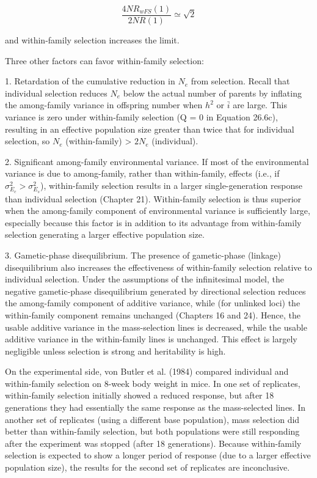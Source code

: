 \documentclass{article}
\begin{document}
{\begin{equation}
\frac{4NR_{wFS}(1)}{2NR(1)}\simeq\sqrt{2}
\end{equation}

and within-family selection increases the limit.

Three other factors can favor within-family selection:

1. Retardation of the cumulative reduction in  $ N_e $ from selection. Recall that individual selection reduces  $ N_e $ below the actual number of parents by inflating the among-family variance in offspring number when  $ h^2 $ or  $ \bar{i} $ are large. This variance is zero under within-family selection (Q = 0 in Equation 26.6c), resulting in an effective population size greater than twice that for individual selection, so  $ N_e $ (within-family) >  $ 2N_e $ (individual).

2. Significant among-family environmental variance. If most of the environmental variance is due to among-family, rather than within-family, effects (i.e., if  $ \sigma_{E_c}^2 > \sigma_{E_s}^2 $), within-family selection results in a larger single-generation response than individual selection (Chapter 21). Within-family selection is thus superior when the among-family component of environmental variance is sufficiently large, especially because this factor is in addition to its advantage from within-family selection generating a larger effective population size.

3. Gametic-phase disequilibrium. The presence of gametic-phase (linkage) disequilibrium also increases the effectiveness of within-family selection relative to individual selection. Under the assumptions of the infinitesimal model, the negative gametic-phase disequilibrium generated by directional selection reduces the among-family component of additive variance, while (for unlinked loci) the within-family component remains unchanged (Chapters 16 and 24). Hence, the usable additive variance in the mass-selection lines is decreased, while the usable additive variance in the within-family lines is unchanged. This effect is largely negligible unless selection is strong and heritability is high.

On the experimental side, von Butler et al. (1984) compared individual and within-family selection on 8-week body weight in mice. In one set of replicates, within-family selection initially showed a reduced response, but after 18 generations they had essentially the same response as the mass-selected lines. In another set of replicates (using a different base population), mass selection did better than within-family selection, but both populations were still responding after the experiment was stopped (after 18 generations). Because within-family selection is expected to show a longer period of response (due to a larger effective population size), the results for the second set of replicates are inconclusive.

}
\end{document}
